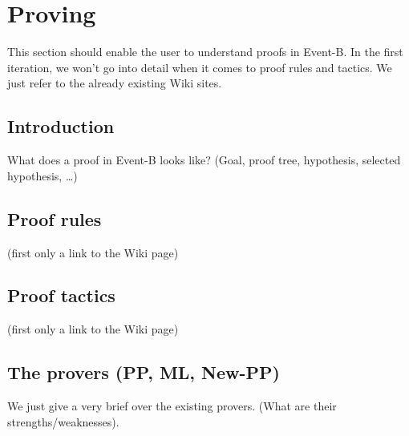 \section{Proving}
\label{reference_04}

This section should enable the user to understand proofs in Event-B. In the first iteration, we won't go into detail when it comes to proof rules and tactics. We just refer to the already existing Wiki sites.
  
\subsection{Introduction}

What does a proof in Event-B looks like? (Goal, proof tree, hypothesis, selected hypothesis, \ldots)

\subsection{Proof rules}

(first only a link to the Wiki page)

\subsection{Proof tactics}

(first only a link to the Wiki page)

\subsection{The provers (PP, ML, New-PP)}

We just give a very brief over the existing provers. (What are their strengths/weaknesses).
